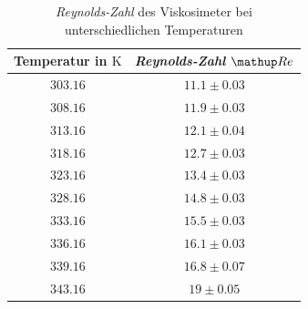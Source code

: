 \begin{table}
\centering
\begin{tabular} {cc}
  \toprule
  Temperatur in $\si{\kelvin}$ & \emph{Reynolds-Zahl} $\map{Re}$ \\
  \midrule 
  $\num{303.16}$ & $\num{11.1}\pm \num{0.03}$ \\
  $\num{308.16}$ & $\num{11.9}\pm \num{0.03}$ \\
  $\num{313.16}$ & $\num{12.1}\pm \num{0.04}$ \\ 
  $\num{318.16}$ & $\num{12.7}\pm \num{0.03}$ \\
  $\num{323.16}$ & $\num{13.4}\pm \num{0.03}$ \\ 
  $\num{328.16}$ & $\num{14.8}\pm \num{0.03}$ \\ 
  $\num{333.16}$ & $\num{15.5}\pm \num{0.03}$ \\ 
  $\num{336.16}$ & $\num{16.1}\pm \num{0.03}$ \\
  $\num{339.16}$ & $\num{16.8}\pm \num{0.07}$ \\
  $\num{343.16}$ & $\num{19}\pm \num{0.05}$ \\
\bottomrule
\end{tabular}
\caption{\emph{Reynolds-Zahl} des Viskosimeter bei unterschiedlichen Temperaturen}
\label{tab:rey_visko}
\end{table}